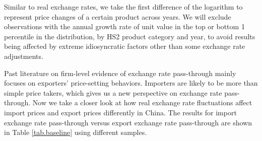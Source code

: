 \documentclass[12pt]{article}
\begin{document}
Similar to real exchange rates, we take the first difference of the logarithm to represent price changes of a certain product across years. We will exclude observations with the annual growth rate of unit value in the top or bottom 1 percentile in the distribution, by HS2 product category and year, to avoid results being affected by extreme idiosyncratic factors other than some exchange rate adjustments.

Past literature on firm-level evidence of exchange rate pass-through mainly focuses on exporters' price-setting behaviors. Importers are likely to be more than simple price takers, which gives us a new perspective on exchange rate pass-through. Now we take a closer look at how real exchange rate fluctuations affect import prices and export prices differently in China. The results for import exchange rate pass-through versus export exchange rate pass-through are shown in Table \ref{tab.baseline} using different samples.
\end{document}
